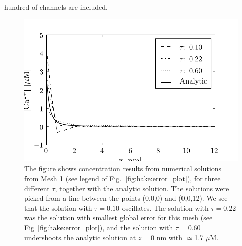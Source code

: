 hundred of channels are included.
\begin{figure}
  \label{fig:hake:traces_mesh_1}
  \includegraphics[width=\linewidth]{chapters/hake/pdf/traces_mesh_1}
  \caption[Concentration traces 1]{The figure shows concentration
    results from numerical solutions from Mesh 1 (see legend of
    Fig.~\ref{fig:hake:error_plot}), for three different $\tau$,
    together with the analytic solution. The solutions were picked
    from a line between the points (0,0,0) and (0,0,12). We see that
    the solution with $\tau=0.10$ oscillates. The solution with
    $\tau=0.22$ was the solution with smallest global error for this
    mesh (see Fig~\ref{fig:hake:error_plot}), and the solution with
    $\tau=0.60$ undershoots the analytic solution at $z=0$ nm with
    $\simeq$1.7 $\mu$M.}
\end{figure}

